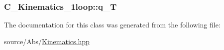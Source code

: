 \hypertarget{class_c___kinematics__1loop_a0161d7d82d26adecb78c780d8f63a4b4}{
\subsubsection[{q\-\_\-\-T}]{ C\-\_\-\-Kinematics\-\_\-1loop\-::q\-\_\-\-T}}\label{class_c___kinematics__1loop_a0161d7d82d26adecb78c780d8f63a4b4}


The documentation for this class was generated from the following file\-:\begin{DoxyCompactItemize}
\item 
source/\-Abs/\hyperlink{_kinematics_8hpp}{Kinematics.\-hpp}\end{DoxyCompactItemize}
